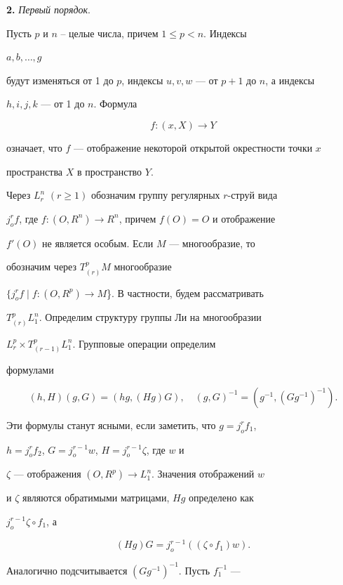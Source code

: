 {\bf 2.} {\it Первый порядок}.


Пусть $p$ и $n$ -- целые числа, причем $1 \le p < n$. Индексы


$a,b,\dotsc,g$


будут изменяться от 1 до $p$, индексы $u,v,w$ --- от $p+1$ до $n$, а индексы


$h,i,j,k$ --- от 1 до $n$. Формула


$$


f: (x, X) \to Y


$$


означает, что $f$ --- отображение некоторой открытой окрестности точки $x$


пространства $X$ в пространство $Y$.





Через $L^n_r$ $(r \ge 1)$ обозначим группу регулярных $r$-струй вида


$j^r_o f$, где $f: (O,R^n) \to R^n$, причем $f(O) = O$ и отображение


$f'(O)$ не является особым. Если $M$ --- многообразие, то


обозначим через $T^p_{(r)} M$ многообразие


$\{ j^r_o f \mid f: (O,R^p) \to M$\}. В частности, будем рассматривать


$T^p_{(r)} L^n_1$. Определим структуру группы Ли на многообразии


$L^p_r \times T^p_{(r-1)} L^n_1$. Групповые операции определим


формулами


$$


(h,H)(g,G) = (hg, (Hg)G),\quad (g,G)^{-1} = (g^{-1},(Gg^{-1})^{-1}).


$$


Эти формулы станут ясными, если заметить, что $g = j^r_o f_1$,


$h = j^r_o f_2$, $G = j^{r-1}_o w$, $H = j^{r-1}_o \zeta$, где $w$ и


$\zeta$ --- отображения $(O,R^p) \to L^n_1$. Значения отображений $w$


и $\zeta$ являются обратимыми матрицами, $Hg$ определено как


$j^{r-1}_o \zeta \circ f_1$, а


$$


(Hg)G = j^{r-1}_o ((\zeta \circ f_1)w).


$$


Аналогично подсчитывается $(Gg^{-1})^{-1}$. Пусть $f^{-1}_1$ ---


